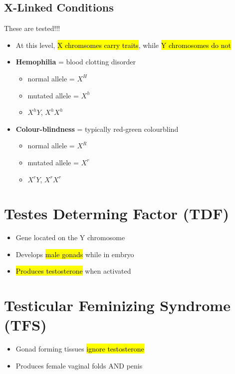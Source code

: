 \documentclass[a4paper,12pt]{article}
\begin{document}
\subsection{X-Linked Conditions}
These are tested!!!
\begin{itemize}
    \item{At this level, \hl{X chromsomes carry traits}, while \hl{Y chromosomes do not}}
    \item{
            \textbf{Hemophilia} = blood clotting disorder
            \begin{itemize}
                \item{normal allele = $X^H$}
                \item{mutated allele = $X^h$}
                \item{$X^hY$, $X^hX^h$}
            \end{itemize}
        }
    \item{
            \textbf{Colour-blindness} = typically red-green colourblind
            \begin{itemize}
                \item{normal allele = $X^R$}
                \item{mutated allele = $X^r$}
                \item{$X^rY$, $X^rX^r$}
            \end{itemize}
        }
\end{itemize}

\section{Testes Determing Factor (TDF)}
\begin{itemize}
    \item{Gene located on the Y chromosome}
    \item{Develops \hl{male gonads} while in embryo}
    \item{\hl{Produces testosterone} when activated}
\end{itemize}

\section{Testicular Feminizing Syndrome (TFS)}
\begin{itemize}
    \item{Gonad forming tissues \hl{ignore testosterone}}
    \item{Produces female vaginal folds AND penis}
\end{itemize}
\end{document}
